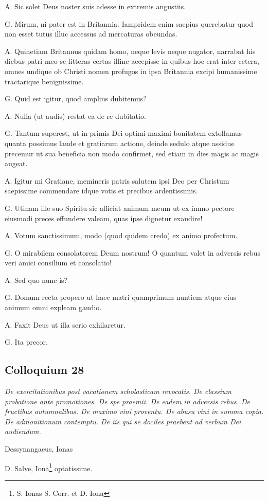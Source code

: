 \documentclass{article}
\begin{document}
A. Sic solet Deus noster suis adesse in extremis angustiis.

G. Mirum, ni pater est in Britannia. Iampridem enim saepius querebatur quod non esset tutus illuc accessus ad mercaturas obeundas.

A. Quinetiam Britannus quidam homo, neque levis neque nugator, narrabat his diebus patri meo se litteras certas illinc accepisse in quibus hoc erat inter cetera, omnes undique ob Christi nomen profugos in ipsa Britannia excipi humanissime tractarique benignissime.

G. Quid est igitur, quod amplius dubitemus?

A. Nulla (ut audis) restat ea de re dubitatio.

G. Tantum superest, ut in primis Dei optimi maximi bonitatem extollamus quanta possimus laude et gratiarum actione, deinde sedulo atque assidue precemur ut sua beneficia non modo confirmet, sed etiam in dies magis ac magis augeat.

A. Igitur mi Gratiane, memineris patris salutem ipsi Deo per Christum saepissime commendare idque votis et precibus ardentissimis.

G. Utinam ille suo Spiritu sic afficiat animum meum ut ex immo pectore eiusmodi preces effundere valeam, quas ipse dignetur exaudire!

A. Votum sanctissimum, modo (quod quidem credo) ex animo profectum.

G. O mirabilem consolatorem Deum nostrum! O quantum valet in adversis rebus veri amici consilium et consolatio!

A. Sed quo nunc is?

G. Domum recta propero ut haec matri quamprimum nuntiem atque eius animum omni expleam gaudio.

A. Faxit Deus ut illa serio exhilaretur.

G. Ita precor.

\subsection{Colloquium 28}
\emph{De exercitationibus post vacationem scholasticam revocatis. De classium probatione ante promotiones. De spe praemii. De eadem in adversis rebus. De fructibus autumnalibus. De maximo vini proventu. De abusu vini in summa copia. De admonitionum contemptu. De iis qui se dociles praebent ad verbum Dei audiendum.}

Dessynangaeus, Ionas

D. Salve, Iona\footnote{S. Ionas S. Corr. et D. Iona} optatissime.
\end{document}
